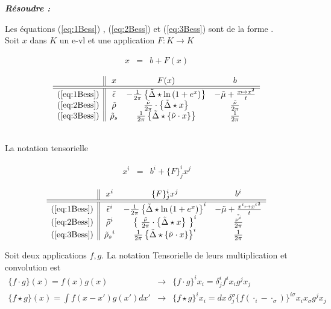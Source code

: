 { \bf \em Résoudre :}



Les équations (\ref{eq:1Bess}) ,   (\ref{eq:2Bess}) et  (\ref{eq:3Bess}) sont de la forme .\\

Soit $x$ dans $K$ un e-vl  et une application $F \colon K \rightarrow K $

\begin{eqnarray}
	x & = & b + F ( x ) 	
\end{eqnarray}


$$
\begin{array}{c||ccc}
	& x & F( x )  & b \\
	\hline\hline
	(\ref{eq:1Bess}) & \tilde{\epsilon} & - \frac{1}{2 \pi} \left \{\tilde{\Delta} \star \ln \left ( 1 + e^{x} \right )  \right \} & - \tilde{\mu} + \frac{x \mapsto x^2 }{t}	\\
	(\ref{eq:2Bess}) & \tilde{\rho}  & \frac{\tilde{\nu}}{2 \pi} \cdot  \left \{\tilde{\Delta} \star x \right \} & \frac{\tilde{\nu}}{2 \pi} \\
	(\ref{eq:3Bess}) & \tilde{\rho}_s  & \frac{1}{2 \pi} \left \{\tilde{\Delta} \star \{\tilde{\nu} \cdot  x\} \right \} & \frac{1}{2 \pi} 
\end{array}
$$

{~}\\

La notation tensorielle 


\begin{eqnarray}
	x^i & = & b^i + \{F\}^i_j  x^j  	
\end{eqnarray}


$$
\begin{array}{c||ccc}
	& x^i & \{F\}^i_j  x^j & b^i\\
	\hline\hline
	(\ref{eq:1Bess}) & \tilde{\epsilon}^i & - \frac{1}{2 \pi} \left \{\tilde{\Delta} \star \ln \left ( 1 + e^{x } \right )  \right \}^i  & - \tilde{\mu} + \frac{x^i  \mapsto {x^i }^2 }{t}	\\
	(\ref{eq:2Bess}) & \tilde{\rho}^i  &  \left  \{ \frac{\tilde{\nu}}{2 \pi} \cdot \left \{\tilde{\Delta} \star x \right  \} \right \}^i & \frac{\tilde{\nu^i}}{2 \pi} \\
	(\ref{eq:3Bess}) & {\tilde{\rho}_s}^i  &  \frac{1}{2 \pi} \left \{\tilde{\Delta} \star \{\tilde{\nu} \cdot  x\} \right \}^i & \frac{1}{2 \pi} 
\end{array}
$$

Soit deux applications $f , g $. La notation Tensorielle de leurs multiplication et convolution est 
\begin{eqnarray}
	\{f \cdot   g \} ( x ) = f(x)  g(x) & \rightarrow & \{ f \cdot g \}^i x_i = \delta^i_j f^ix_i g^j x_j  \\
	\{f \star  g \} ( x ) = {\textstyle \int f ( x - x' ) g ( x' )  d x '}  & \rightarrow &	 \{ f \star g  \}^i x_i  = dx \, \delta^\sigma_j \{  f ( \cdot_i -\cdot_\sigma  )\}^{i\sigma } x_i x_\sigma   g^j x_j   
\end{eqnarray}



